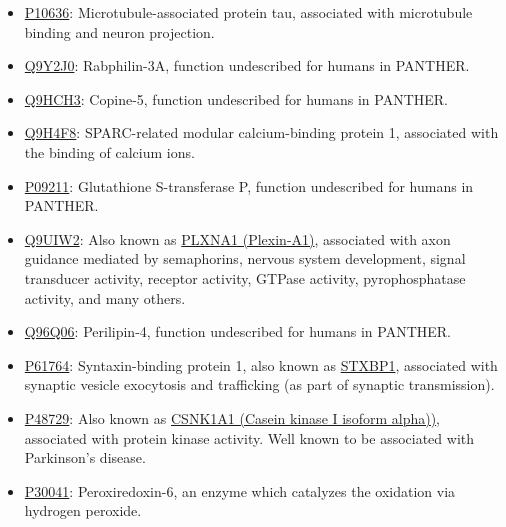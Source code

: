 \begin{itemize}
\item \href{http://www.pantherdb.org/genes/gene.do?acc=HUMAN\%7CHGNC\%3D6893\%7CUniProtKB\%3DP10636}{P10636}: Microtubule-associated protein tau, associated with microtubule binding and neuron projection.
\item \href{http://www.pantherdb.org/genes/gene.do?acc=HUMAN\%7CHGNC\%3D17056\%7CUniProtKB\%3DQ9Y2J0}{Q9Y2J0}: Rabphilin-3A, function undescribed for humans in PANTHER.
\item \href{http://www.pantherdb.org/genes/gene.do?acc=HUMAN\%7CHGNC\%3D2318\%7CUniProtKB\%3DQ9HCH3}{Q9HCH3}: Copine-5, function undescribed for humans in PANTHER.
\item \href{http://www.pantherdb.org/genes/gene.do?acc=HUMAN\%7CHGNC\%3D20318\%7CUniProtKB\%3DQ9H4F8}{Q9H4F8}: SPARC-related modular calcium-binding protein 1, associated with the binding of calcium ions.
\item \href{http://www.pantherdb.org/genes/gene.do?acc=HUMAN\%7CHGNC\%3D4638\%7CUniProtKB\%3DP09211}{P09211}: Glutathione S-transferase P, function undescribed for humans in PANTHER.
\item \href{http://www.pantherdb.org/genes/gene.do?acc=HUMAN\%7CHGNC\%3D9099\%7CUniProtKB\%3DQ9UIW2}{Q9UIW2}: Also known as \href{https://www.uniprot.org/uniprot/Q9UIW2}{PLXNA1 (Plexin-A1)}, associated with axon guidance mediated by semaphorins, nervous system development, signal transducer activity, receptor activity, GTPase activity, pyrophosphatase activity, and many others.
\item \href{http://www.pantherdb.org/genes/gene.do?acc=HUMAN\%7CHGNC\%3D29393\%7CUniProtKB\%3DQ96Q06}{Q96Q06}: Perilipin-4, function undescribed for humans in PANTHER.
\item \href{http://www.pantherdb.org/genes/gene.do?acc=HUMAN\%7CHGNC\%3D11444\%7CUniProtKB\%3DP61764}{P61764}: Syntaxin-binding protein 1, also known as \href{https://www.uniprot.org/uniprot/P61764}{STXBP1}, associated with synaptic vesicle exocytosis and trafficking (as part of synaptic transmission).
\item \href{http://www.pantherdb.org/genes/gene.do?acc=HUMAN\%7CHGNC\%3D2451\%7CUniProtKB\%3DP48729}{P48729}: Also known as \href{https://www.uniprot.org/uniprot/P48729}{CSNK1A1 (Casein kinase I isoform alpha))}, associated with protein kinase activity. Well known to be associated with Parkinson's disease.
\item \href{http://www.pantherdb.org/genes/gene.do?acc=HUMAN\%7CHGNC\%3D16753\%7CUniProtKB\%3DP30041}{P30041}: Peroxiredoxin-6, an enzyme which catalyzes the oxidation via hydrogen peroxide.

\end{itemize}
